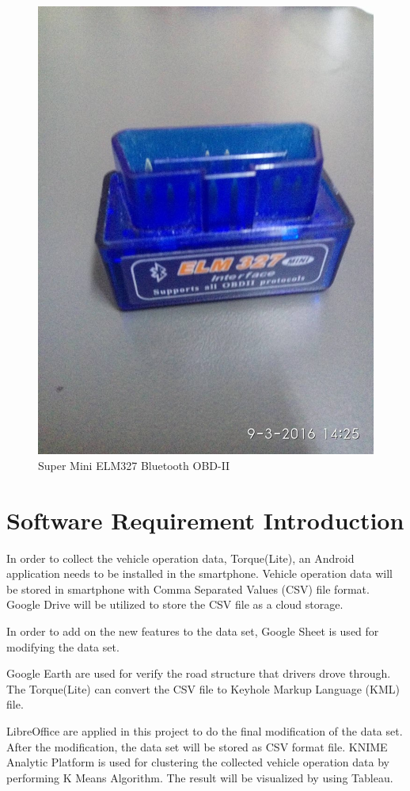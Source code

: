 \begin{figure}[hbt!]\centering
\includegraphics[width=.75\textwidth]{image/ELM327}
\caption{Super Mini ELM327 Bluetooth OBD-II}
\end{figure}

\section{Software Requirement Introduction}
In order to collect the vehicle operation data, Torque(Lite), an Android application needs to be installed in the smartphone. Vehicle operation data will be stored in smartphone with Comma Separated Values (CSV) file format. Google Drive will be utilized to store the CSV file as a cloud storage.

In order to add on the new features to the data set, Google Sheet is used for modifying the data set. 

Google Earth are used for verify the road structure that drivers drove through. The Torque(Lite) can convert the CSV file to Keyhole Markup Language (KML) file.
 
LibreOffice are applied in this project to do the final modification of the data set. After the modification, the data set will be stored as CSV format file. KNIME Analytic Platform is used for clustering the collected vehicle operation data by performing K Means Algorithm. The result will be visualized by using Tableau.

